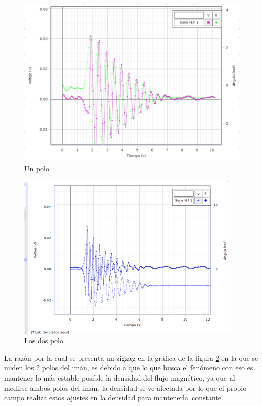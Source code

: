 \documentclass{article}
\begin{document}
\begin{figure}[H]
   \centering
   \includegraphics[scale=0.7]{../imgs/f.png}
   \caption{Un polo}
   \label{Fig:1}
\end{figure}

\begin{figure}[H]
   \centering
   \includegraphics[scale=0.7]{../imgs/f0.png}
   \caption{Los dos polo}
   \label{Fig:2}
\end{figure}

La razón por la cual se presenta un zigzag en la gráfica de la figura \ref{Fig:2} en la que se miden los 2 polos del imán, es debido a que lo que busca el fenómeno con eso es mantener lo más estable posible la densidad del flujo magnético, ya que al medirse ambos polos del imán, la densidad se ve afectada por lo que el propio campo realiza estos ajustes en la densidad para mantenerla constante.
\end{document}
